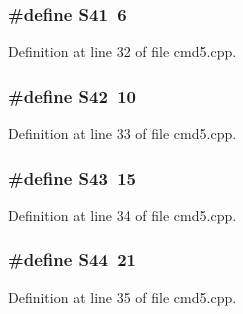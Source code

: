 \subsubsection[{S41}]{\setlength{\rightskip}{0pt plus 5cm}\#define S41~6}\label{cmd5_8cpp_ab674ba129e588da55d1d494e1cf3c15e}


Definition at line 32 of file cmd5.\+cpp.

\subsubsection[{S42}]{\setlength{\rightskip}{0pt plus 5cm}\#define S42~10}\label{cmd5_8cpp_a268ef1a49114a94b931cc6b313e3cd1b}


Definition at line 33 of file cmd5.\+cpp.

\subsubsection[{S43}]{\setlength{\rightskip}{0pt plus 5cm}\#define S43~15}\label{cmd5_8cpp_a5aaa7121f39650d472746942ca68f959}


Definition at line 34 of file cmd5.\+cpp.

\subsubsection[{S44}]{\setlength{\rightskip}{0pt plus 5cm}\#define S44~21}\label{cmd5_8cpp_a6a3989af72b55d169bd73a66f8620aae}


Definition at line 35 of file cmd5.\+cpp.

